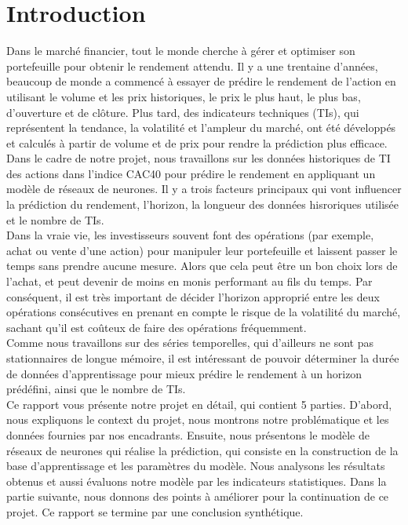 
\section{Introduction}

Dans le marché financier, tout le monde cherche à gérer et optimiser son portefeuille pour obtenir le rendement attendu. Il y a une trentaine d'années, beaucoup de monde a commencé à essayer de prédire le rendement de l'action en utilisant le volume et les prix historiques, le prix le plus haut, le plus bas, d'ouverture et de clôture. Plus tard, des indicateurs techniques (TIs), qui représentent la tendance, la volatilité et l'ampleur du marché, ont été développés et calculés à partir de volume et de prix pour rendre la prédiction plus efficace.\\

Dans le cadre de notre projet, nous travaillons sur les données historiques de TI des actions dans l'indice CAC40 pour prédire le rendement en appliquant un modèle de réseaux de neurones. Il y a trois facteurs principaux qui vont influencer la prédiction du rendement, l'horizon, la longueur des données hisroriques utilisée et le nombre de TIs.\\

Dans la vraie vie, les investisseurs souvent font des opérations (par exemple, achat ou vente d'une action) pour manipuler leur portefeuille et laissent passer le temps sans prendre aucune mesure. Alors que cela peut être un bon choix lors de l'achat, et peut devenir de moins en monis performant au fils du temps. Par conséquent, il est très important de décider l'horizon approprié entre les deux opérations consécutives en prenant en compte le risque de la volatilité du marché, sachant qu'il est coûteux de faire des opérations fréquemment.\\

Comme nous travaillons sur des séries temporelles, qui d'ailleurs ne sont pas stationnaires de longue mémoire, il est intéressant de pouvoir déterminer la durée de données d'apprentissage pour mieux prédire le rendement à un horizon prédéfini, ainsi que le nombre de TIs.\\

Ce rapport vous présente notre projet en détail, qui contient 5 parties. D’abord, nous expliquons le context du projet, nous montrons notre problématique et les données fournies par nos encadrants. Ensuite, nous présentons le modèle de réseaux de neurones  qui réalise la prédiction, qui consiste en la construction de la base d’apprentissage et les paramètres du modèle. Nous analysons les résultats obtenus et aussi évaluons notre modèle par les indicateurs statistiques. Dans la partie suivante, nous donnons des points à améliorer pour la continuation de ce projet. Ce rapport se termine par une conclusion synthétique. 


